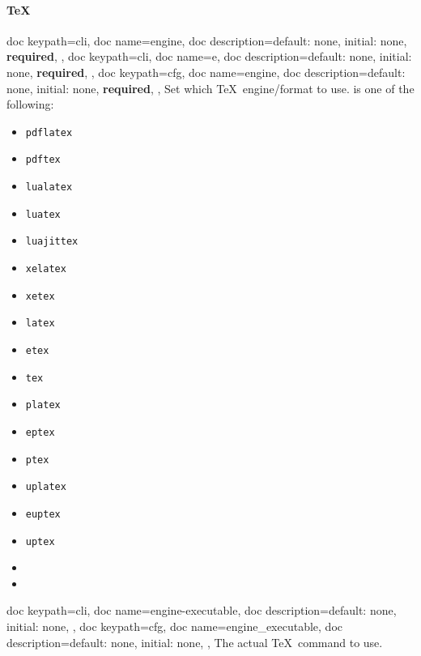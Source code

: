 \documentclass[a4paper, 11pt]{scrartcl}
\let\TeXold\TeX
\renewcommand\TeX{\TeXold\xspace}
\begin{document}
\paragraph{\TeX}
\begin{docKeys}[
		doc parameter={=\meta{engine}},
	]{
		{
			doc keypath=cli,
			doc name=engine,
			doc description={default: none, initial: none, \textcolor{CtpRed}{\bfseries\sffamily required}},
		},
		{
			doc keypath=cli,
			doc name=e,
			doc description={default: none, initial: none, \textcolor{CtpRed}{\bfseries\sffamily required}},
		},
		{
			doc keypath=cfg,
			doc name=engine,
			doc description={default: none, initial: none, \textcolor{CtpRed}{\bfseries\sffamily required}},
		},
	}
	Set which \TeX\ engine/format to use.
	 is one of the following:
	\begin{multicols}{3}
		\begin{itemize}
			\item \texttt{pdflatex}
			\item \texttt{pdftex}
			\item \texttt{lualatex}
			\item \texttt{luatex}
			\item \texttt{luajittex}
			\item \texttt{xelatex}
			\item \texttt{xetex}
			\item \texttt{latex}
			\item \texttt{etex}
			\item \texttt{tex}
			\item \texttt{platex}
			\item \texttt{eptex}
			\item \texttt{ptex}
			\item \texttt{uplatex}
			\item \texttt{euptex}
			\item \texttt{uptex}
			\item[]
			\item[]
		\end{itemize}
	\end{multicols}
\end{docKeys}
\begin{docKeys}[
		doc parameter={=\meta{engine\_executable}},
	]{
		{
			doc keypath=cli,
			doc name=engine-executable,
			doc description={default: none, initial: none},
		},
		{
			doc keypath=cfg,
			doc name=engine_executable,
			doc description={default: none, initial: none},
		},
	}
	The actual \TeX\ command to use.
\end{docKeys}
\end{document}
